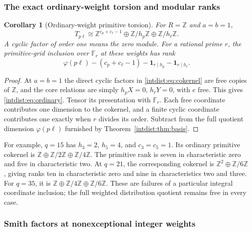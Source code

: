 \documentclass[11pt,a4paper]{article}
\numberwithin{equation}{section}
\theoremstyle{plain}
\newtheorem{corollary}[theorem]{Corollary}
\theoremstyle{definition}
\theoremstyle{remark}
\begin{document}
\subsubsection{The exact ordinary-weight torsion and modular ranks}

\begin{corollary}[Ordinary-weight primitive torsion]
\label{intdist:cor:ordinary}
For $R=\mathbb Z$ and $a=b=1$,
\begin{equation}\label{intdist:eq:ordinary}
 T_{p\ell}\cong
 \mathbb Z^{c_p+c_\ell-1}
 \oplus\mathbb Z/h_p\mathbb Z
 \oplus\mathbb Z/h_\ell\mathbb Z.
\end{equation}
A cyclic factor of order one means the zero module. For a rational
prime $r$, the primitive-grid inclusion over $\mathbb F_r$ at these
weights has rank
\begin{equation}\label{intdist:eq:modular-rank}
 \varphi(p\ell)-(c_p+c_\ell-1)
 -\mathbf1_{r\mid h_p}-\mathbf1_{r\mid h_\ell}.
\end{equation}
\end{corollary}

\begin{proof}
At $a=b=1$ the direct cyclic factors in
\eqref{intdist:eq:cokernel} are free copies of $\mathbb Z$, and the
core relations are simply $h_pX=0$, $h_\ell Y=0$, with $e$ free.
This gives \eqref{intdist:eq:ordinary}. Tensor its presentation with
$\mathbb F_r$. Each free coordinate contributes one dimension to the
cokernel, and a finite cyclic coordinate contributes one exactly when
$r$ divides its order. Subtract from the full quotient dimension
$\varphi(p\ell)$ furnished by Theorem~\ref{intdist:thm:basis}.
\end{proof}

For example, $q=15$ has $h_3=2$, $h_5=4$, and $c_3=c_5=1$.
Its ordinary primitive cokernel is
$\mathbb Z\oplus\mathbb Z/2\mathbb Z\oplus\mathbb Z/4\mathbb Z$.
The primitive rank is seven in characteristic zero and five in
characteristic two. At $q=21$, the corresponding cokernel is
$\mathbb Z^2\oplus\mathbb Z/6\mathbb Z$, giving ranks ten in
characteristic zero and nine in characteristics two and three.
For $q=35$, it is
$\mathbb Z\oplus\mathbb Z/4\mathbb Z\oplus\mathbb Z/6\mathbb Z$.
These are failures of a particular integral coordinate inclusion; the
full weighted distribution quotient remains free in every case.

\subsubsection{Smith factors at nonexceptional integer weights}
\end{document}
